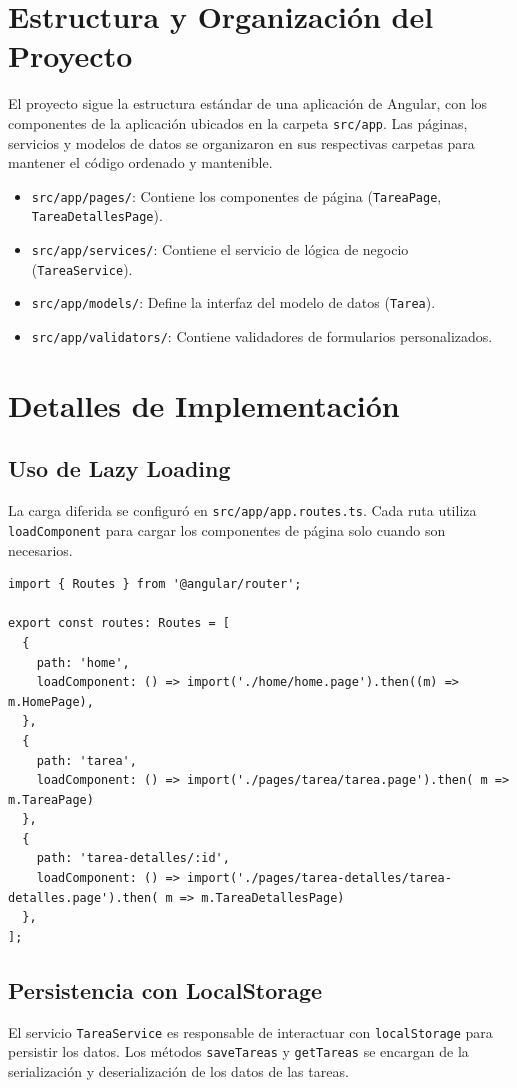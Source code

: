 \documentclass{article}
\begin{document}
\section{Estructura y Organización del Proyecto}
El proyecto sigue la estructura estándar de una aplicación de Angular, con los componentes de la aplicación ubicados en la carpeta \texttt{src/app}. Las páginas, servicios y modelos de datos se organizaron en sus respectivas carpetas para mantener el código ordenado y mantenible.

\begin{itemize}
    \item \texttt{src/app/pages/}: Contiene los componentes de página (\texttt{TareaPage}, \texttt{TareaDetallesPage}).
    \item \texttt{src/app/services/}: Contiene el servicio de lógica de negocio (\texttt{TareaService}).
    \item \texttt{src/app/models/}: Define la interfaz del modelo de datos (\texttt{Tarea}).
    \item \texttt{src/app/validators/}: Contiene validadores de formularios personalizados.
\end{itemize}

\section{Detalles de Implementación}

\subsection{Uso de Lazy Loading}
La carga diferida se configuró en \texttt{src/app/app.routes.ts}. Cada ruta utiliza \texttt{loadComponent} para cargar los componentes de página solo cuando son necesarios.

\begin{lstlisting}[breaklines=true]
import { Routes } from '@angular/router';

export const routes: Routes = [
  {
    path: 'home',
    loadComponent: () => import('./home/home.page').then((m) => m.HomePage),
  },
  {
    path: 'tarea',
    loadComponent: () => import('./pages/tarea/tarea.page').then( m => m.TareaPage)
  },
  {
    path: 'tarea-detalles/:id',
    loadComponent: () => import('./pages/tarea-detalles/tarea-detalles.page').then( m => m.TareaDetallesPage)
  },
];
\end{lstlisting}

\subsection{Persistencia con LocalStorage}
El servicio \texttt{TareaService} es responsable de interactuar con \texttt{localStorage} para persistir los datos. Los métodos \texttt{saveTareas} y \texttt{getTareas} se encargan de la serialización y deserialización de los datos de las tareas.
\end{document}
